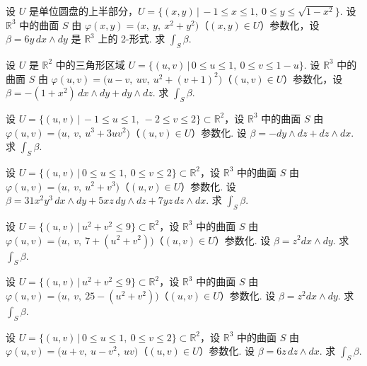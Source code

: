 \begin{question}\label{q:7-23}
设 $U$ 是单位圆盘的上半部分，$U=\bigl\{(x,y)\,\bigl|\,-1\leq x\leq 1,\ 0\leq y\leq\sqrt{1-x^2}\bigr\}$. 设 $\mathbb{R}^3$ 中的曲面 $S$ 由 $\varphi(x,y)=\bigl(x,\ y,\ x^2+y^2\bigr)$（$(x,y)\in U$）参数化，设 $\beta=6y\,dx\wedge dy$ 是 $\mathbb{R}^3$ 上的 2-形式. 求 $\int_S\beta$.
\end{question}

\begin{question}\label{q:7-24}
设 $U$ 是 $\mathbb{R}^2$ 中的三角形区域 $U=\bigl\{(u,v)\,\bigl|\,0\leq u\leq 1,\ 0\leq v\leq 1-u\bigr\}$. 设 $\mathbb{R}^3$ 中的曲面 $S$ 由 $\varphi(u,v)=\bigl(u-v,\ uv,\ u^2+(v+1)^2\bigr)$（$(u,v)\in U$）参数化，设 $\beta=-(1+x^2)\,dx\wedge dy+dy\wedge dz$. 求 $\int_S\beta$.
\end{question}

\begin{question}\label{q:7-25}
设 $U=\bigl\{(u,v)\,\bigl|\,-1\leq u\leq 1,\ -2\leq v\leq 2\bigr\}\subset\mathbb{R}^2$，设 $\mathbb{R}^3$ 中的曲面 $S$ 由 $\varphi(u,v)=\bigl(u,\ v,\ u^3+3uv^2\bigr)$（$(u,v)\in U$）参数化. 设 $\beta=-dy\wedge dz+dz\wedge dx$. 求 $\int_S\beta$.
\end{question}

\begin{question}\label{q:7-26}
设 $U=\bigl\{(u,v)\,\bigl|\,0\leq u\leq 1,\ 0\leq v\leq 2\bigr\}\subset\mathbb{R}^2$，设 $\mathbb{R}^3$ 中的曲面 $S$ 由 $\varphi(u,v)=\bigl(u,\ v,\ u^2+v^3\bigr)$（$(u,v)\in U$）参数化. 设 $\beta=31x^2y^3\,dx\wedge dy+5xz\,dy\wedge dz+7yz\,dz\wedge dx$. 求 $\int_S\beta$.
\end{question}

\begin{question}\label{q:7-27}
设 $U=\bigl\{(u,v)\,\bigl|\,u^2+v^2\leq 9\bigr\}\subset\mathbb{R}^2$，设 $\mathbb{R}^3$ 中的曲面 $S$ 由 $\varphi(u,v)=\bigl(u,\ v,\ 7+(u^2+v^2)\bigr)$（$(u,v)\in U$）参数化. 设 $\beta=z^2dx\wedge dy$. 求 $\int_S\beta$.
\end{question}

\begin{question}\label{q:7-28}
设 $U=\bigl\{(u,v)\,\bigl|\,u^2+v^2\leq 9\bigr\}\subset\mathbb{R}^2$，设 $\mathbb{R}^3$ 中的曲面 $S$ 由 $\varphi(u,v)=\bigl(u,\ v,\ 25-(u^2+v^2)\bigr)$（$(u,v)\in U$）参数化. 设 $\beta=z^2dx\wedge dy$. 求 $\int_S\beta$.
\end{question}

\begin{question}\label{q:7-29}
设 $U=\bigl\{(u,v)\,\bigl|\,0\leq u\leq 1,\ 0\leq v\leq 2\bigr\}\subset\mathbb{R}^2$，设 $\mathbb{R}^3$ 中的曲面 $S$ 由 $\varphi(u,v)=\bigl(u+v,\ u-v^2,\ uv\bigr)$（$(u,v)\in U$）参数化. 设 $\beta=6z\,dz\wedge dx$. 求 $\int_S\beta$.
\end{question}

